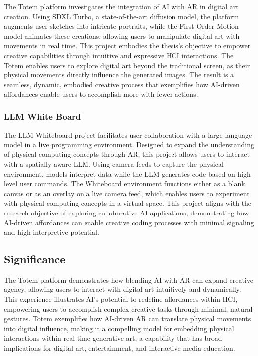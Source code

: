 The Totem platform investigates the integration of AI with AR in digital art creation.
Using SDXL Turbo, a state-of-the-art diffusion model, the platform augments user sketches into intricate portraits, while the First Order Motion model animates these creations, allowing users to manipulate digital art with movements in real time. 
This project embodies the thesis’s objective to empower creative capabilities through intuitive and expressive HCI interactions.
The Totem enables users to explore digital art beyond the traditional screen, as their physical movements directly influence the generated images.
The result is a seamless, dynamic, embodied creative process that exemplifies how AI-driven affordances enable users to accomplish more with fewer actions.

\subsubsection{LLM White Board}

The LLM Whiteboard project facilitates user collaboration with a large language model in a live programming environment.
Designed to expand the understanding of physical computing concepts through AR, this project allows users to interact with a spatially aware LLM.
Using camera feeds to capture the physical environment, models interpret data while the LLM generates code based on high-level user commands.
The Whiteboard environment functions either as a blank canvas or as an overlay on a live camera feed, which enables users to experiment with physical computing concepts in a virtual space. 
This project aligns with the research objective of exploring collaborative AI applications, demonstrating how AI-driven affordances can enable creative coding processes with minimal signaling and high interpretive potential.

\subsection{Significance}

The Totem platform demonstrates how blending AI with AR can expand creative agency, allowing users to interact with digital art intuitively and dynamically.
This experience illustrates AI’s potential to redefine affordances within HCI, empowering users to accomplish complex creative tasks through minimal, natural gestures.
Totem exemplifies how AI-driven AR can translate physical movements into digital influence, making it a compelling model for embedding physical interactions within real-time generative art, a capability that has broad implications for digital art, entertainment, and interactive media education.

